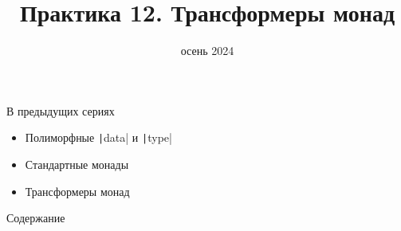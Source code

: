 
\newif\ifhandout




\title[12. Трансформеры монад]{Практика 12. Трансформеры монад}
\date{осень 2024}



    \setcounter{framenumber}{-1}
    \maketitle

    \begin{frame}[fragile]{В предыдущих сериях}
        \begin{itemize}
            \item Полиморфные \texttt|data| и \texttt|type|
            \item Стандартные монады
            \item[\newtopic] Трансформеры монад
        \end{itemize}
    \end{frame}

    \begin{frame}[noframenumbering]{Содержание}
        \tableofcontents
    \end{frame}


